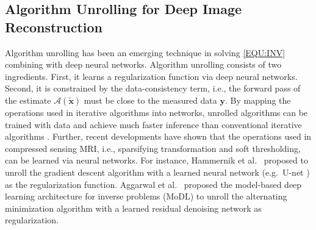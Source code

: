 \documentclass[journal,twoside,web]{ieeecolor}
\begin{document}
%


	\subsection{Algorithm Unrolling for Deep Image Reconstruction}

	Algorithm unrolling has been an emerging technique
	in solving \cref{EQU:INV} combining with deep neural networks.
    Algorithm unrolling consists of two ingredients.
	First, it learns a regularization function
	via deep neural networks.
	Second, it is constrained
	by the data-consistency term,
	i.e., the forward pass of the estimate $\mathcal{A} (\mathbf{\tilde{x}})$
	must be close to the measured data $\mathbf{y}$.
    By mapping the operations used in iterative algorithms
    into networks, unrolled algorithms can be trained with data
    and achieve much faster inference
    than conventional iterative algorithms \cite{monga_2021_algunroll}.
    Further, recent developments have shown that
    the operations used in compressed sensing MRI,
    i.e., sparsifying transformation and soft thresholding,
    can be learned via neural networks.
    For instance, Hammernik et al.~\cite{hammernik_2018_varnet}
    proposed to unroll the gradient descent algorithm
    with a learned neural network
    (e.g.~U-net \cite{ronneberger_2015_unet})
    as the regularization function.
    Aggarwal et al.~\cite{aggarwal_2018_modl} proposed
    the model-based deep learning architecture for inverse problems (MoDL)
    to unroll the alternating minimization algorithm
    with a learned residual denoising network \cite{he_2016_resnet}
    as regularization.
\end{document}
